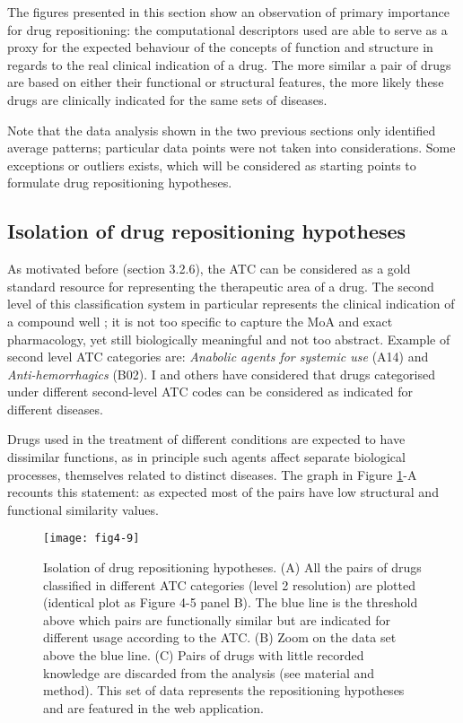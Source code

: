 The figures presented in this section show an observation of primary importance for drug repositioning: the computational descriptors used are able to serve as a proxy for the expected behaviour of the concepts of function and structure in regards to the real clinical indication of a drug. The more similar a pair of drugs are based on either their functional or structural features, the more likely these drugs are clinically indicated for the same sets of diseases.

Note that the data analysis shown in the two previous sections only identified average patterns; particular data points were not taken into considerations. Some exceptions or outliers exists, which will be considered as starting points to formulate drug repositioning hypotheses.

\subsection{Isolation of drug repositioning hypotheses}
As motivated before (section 3.2.6), the ATC can be considered as a gold standard resource for representing the therapeutic area of a drug. The second level of this classification system in particular represents the clinical indication of a compound well \citep{world2006anatomical}; it is not too specific to capture the MoA and exact pharmacology, yet still biologically meaningful and not too abstract. Example of second level ATC categories are: \emph{Anabolic agents for systemic use} (A14) and \emph{Anti-hemorrhagics} (B02). I and others \citep{campillos2008drug} \citep{napolitano2013drug} have considered that drugs categorised under different second-level ATC codes can be considered as indicated for different diseases.

Drugs used in the treatment of different conditions are expected to have dissimilar functions, as in principle such agents affect separate biological processes, themselves related to distinct diseases. The graph in Figure \ref{fig4-9}-A recounts this statement: as expected most of the pairs have low structural and functional similarity values.

\begin{figure}[ht]
    \centering
    \texttt{[image: fig4-9]}
    \caption{Isolation of drug repositioning hypotheses. (A) All the pairs of drugs classified in different ATC categories (level 2 resolution) are plotted (identical plot as Figure 4-5 panel B). The blue line is the threshold above which pairs are functionally similar but are indicated for different usage according to the ATC. (B) Zoom on the data set above the blue line. (C) Pairs of drugs with little recorded knowledge are discarded from the analysis (see material and method). This set of data represents the repositioning hypotheses and are featured in the web application.}
    \label{fig4-9}
\end{figure}

